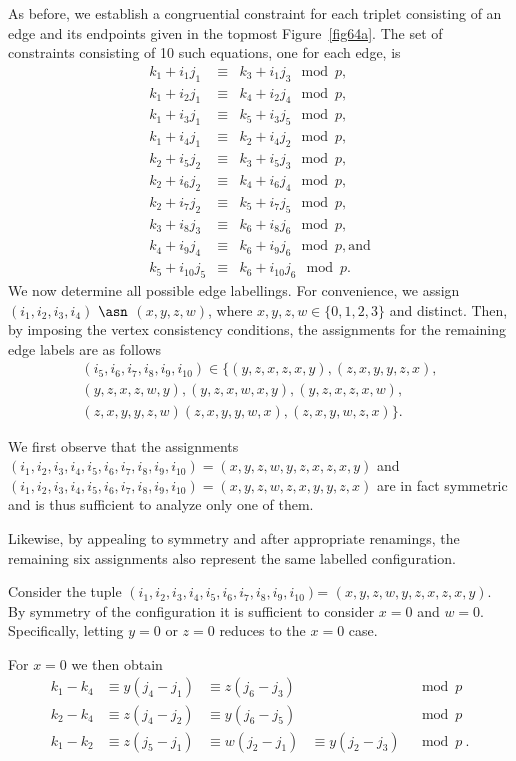 As before, we establish a congruential constraint for each triplet
consisting of an edge and its endpoints given in the topmost
Figure~\ref{fig64a}. The set of constraints consisting of 10 such
equations, one for each edge, is
\begin{eqnarray*}
k_1+i_1j_1 &\equiv& k_3+i_1j_3 \mod p, \\
k_1+i_2j_1 &\equiv& k_4+i_2j_4 \mod p,\\
k_1+i_3j_1 &\equiv& k_5+i_3j_5 \mod p, \\
k_1+i_4j_1 &\equiv& k_2+i_4j_2 \mod p, \\
k_2+i_5j_2 &\equiv& k_3+i_5j_3 \mod p, \\
k_2+i_6j_2 &\equiv& k_4+i_6j_4 \mod p, \\
k_2+i_7j_2 &\equiv& k_5+i_7j_5 \mod p, \\
k_3+i_8j_3 &\equiv& k_6+i_8j_6 \mod p, \\
k_4+i_9j_4 &\equiv& k_6+i_9j_6 \mod p,\text{and} \\
k_5+i_{10}j_5 &\equiv& k_6+i_{10}j_6 \mod p.
\end{eqnarray*}
We now determine all possible edge labellings. For convenience, we
assign $(i_1,i_2,i_3,i_4)$ $\asn$ $(x,y,z,w)$, where $x,y,z,w \in
\{0,1,2,3 \}$ and distinct. Then, by imposing the vertex consistency
conditions, the assignments for the remaining edge labels are as
follows
\begin{eqnarray*}\label{tuples} (i_5,i_6,i_7,i_8,i_9,i_{10}) \in
 \{(y,z,x,z,x,y), (z,x,y,y,z,x),  \\ (y,z,x,z,w,y),
(y,z,x,w,x,y),  (y,z,x,z,x,w),\\(z,x,y,y,z,w)
(z,x,y,y,w,x),(z,x,y,w,z,x) \}.
\end{eqnarray*}

We first observe that the assignments
$(i_1,i_2,i_3,i_4,i_5,i_6,i_7,i_8,i_9,i_{10})=(x,y,z,w,y,z,x,z,x,y)$
and
$(i_1,i_2,i_3,i_4,i_5,i_6,i_7,i_8,i_9,i_{10})=(x,y,z,w,z,x,y,y,z,x)$
are in fact symmetric and is thus sufficient to analyze only one of
them.

Likewise, by appealing to symmetry and after appropriate
renamings, the remaining six assignments also represent the same
labelled configuration.

 Consider the tuple
$(i_1,i_2,i_3,i_4,i_5,i_6,i_7,i_8,i_9,i_{10})$=
$(x,y,z,w,y,z,x,z,x,y)$. By symmetry of the configuration it is
sufficient to consider $x=0$ and $w=0$. Specifically, letting $y=0$
or $z=0$ reduces to the $x=0$ case.

For $x=0$ we then obtain
\begin{equation}\begin{array}{ccccc}
k_1-k_4 &\equiv y(j_4-j_1) &\equiv z(j_6-j_3) &{}& \mod p\\
k_2-k_4 &\equiv z(j_4-j_2) & \equiv y(j_6-j_5) &{} & \mod p\\
 k_1-k_2 &\equiv z(j_5-j_1) & \equiv w(j_2-j_1) &\equiv y(j_2-j_3)& \mod p~.
\end{array}\end{equation}


